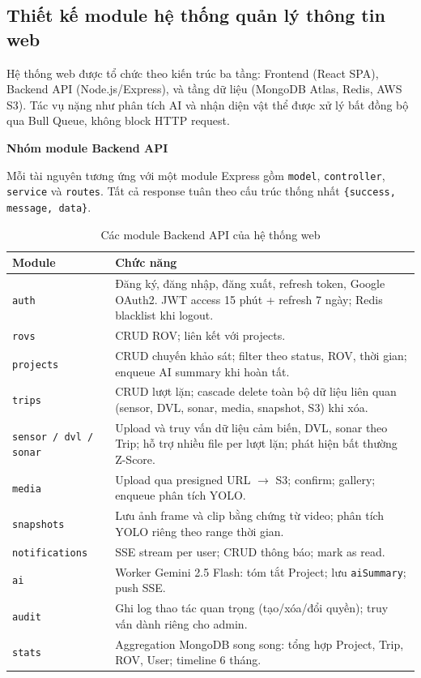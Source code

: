 \documentclass[../DoAn.tex]{subfiles}
\begin{document}
\subsection{Thiết kế module hệ thống quản lý thông tin web}

Hệ thống web được tổ chức theo kiến trúc ba tầng: Frontend (React SPA), Backend API (Node.js/Express), và tầng dữ liệu (MongoDB Atlas, Redis, AWS S3). Tác vụ nặng như phân tích AI và nhận diện vật thể được xử lý bất đồng bộ qua Bull Queue, không block HTTP request.

\subsubsubsection\textbf{Nhóm module Backend API}

Mỗi tài nguyên tương ứng với một module Express gồm \texttt{model}, \texttt{controller}, \texttt{service} và \texttt{routes}. Tất cả response tuân theo cấu trúc thống nhất \texttt{\{success, message, data\}}.

\begin{table}[H]
\centering
\renewcommand{\arraystretch}{1.3}
\begin{tabular}{|p{4.5cm}|p{9cm}|}
\hline
\textbf{Module} & \textbf{Chức năng} \\
\hline
\texttt{auth} & Đăng ký, đăng nhập, đăng xuất, refresh token, Google OAuth2. JWT access 15 phút + refresh 7 ngày; Redis blacklist khi logout. \\
\hline
\texttt{rovs} & CRUD ROV; liên kết với projects. \\
\hline
\texttt{projects} & CRUD chuyến khảo sát; filter theo status, ROV, thời gian; enqueue AI summary khi hoàn tất. \\
\hline
\texttt{trips} & CRUD lượt lặn; cascade delete toàn bộ dữ liệu liên quan (sensor, DVL, sonar, media, snapshot, S3) khi xóa. \\
\hline
\texttt{sensor / dvl / sonar} & Upload và truy vấn dữ liệu cảm biến, DVL, sonar theo Trip; hỗ trợ nhiều file per lượt lặn; phát hiện bất thường Z-Score. \\
\hline
\texttt{media} & Upload qua presigned URL $\to$ S3; confirm; gallery; enqueue phân tích YOLO. \\
\hline
\texttt{snapshots} & Lưu ảnh frame và clip bằng chứng từ video; phân tích YOLO riêng theo range thời gian. \\
\hline
\texttt{notifications} & SSE stream per user; CRUD thông báo; mark as read. \\
\hline
\texttt{ai} & Worker Gemini 2.5 Flash: tóm tắt Project; lưu \texttt{aiSummary}; push SSE. \\
\hline
\texttt{audit} & Ghi log thao tác quan trọng (tạo/xóa/đổi quyền); truy vấn dành riêng cho admin. \\
\hline
\texttt{stats} & Aggregation MongoDB song song: tổng hợp Project, Trip, ROV, User; timeline 6 tháng. \\
\hline
\end{tabular}
\caption{Các module Backend API của hệ thống web}
\label{tab:web_backend_modules}
\end{table}
\end{document}

